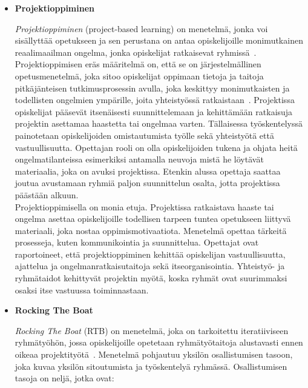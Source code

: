 \documentclass[finnish]{../tktltiki2}
\theoremstyle{definition}
\theoremstyle{remark}
\begin{document}
\begin{itemize}

\enlargethispage{\baselineskip}

\item {\bf Projektioppiminen}

\emph{Projektioppiminen} (project-based learning) on menetelmä, jonka voi sisällyttää opetukseen ja sen perustana on
antaa opiskelijoille monimutkainen reaalimaailman ongelma, jonka opiskelijat
ratkaisevat ryhmissä~\cite{Jun:2010,Larmer:2009,Markham:2003}. Projektioppimisen eräs määritelmä on, että se on järjestelmällinen
opetusmenetelmä, joka sitoo opiskelijat oppimaan tietoja ja taitoja pitkäjänteisen tutkimusprosessin
avulla, joka keskittyy monimutkaisten ja todellisten ongelmien ympärille, joita yhteistyössä
ratkaistaan~\cite{Markham:2003}. Projektissa opiskelijat pääsevät itsenäisesti suunnittelemaan ja kehittämään
ratkaisuja projektin asettamaa haastetta tai ongelmaa varten. Tällaisessa työskentelyssä painotetaan opiskelijoiden omistautumista
työlle sekä yhteistyötä että vastuullisuutta. Opettajan rooli on olla opiskelijoiden tukena ja ohjata heitä
ongelmatilanteissa esimerkiksi antamalla neuvoja mistä he löytävät materiaalia, joka on avuksi projektissa.
Etenkin alussa opettaja saattaa joutua avustamaan ryhmiä paljon suunnittelun osalta, jotta projektissa päästään alkuun.\\

Projektioppimisella on monia etuja. Projektissa ratkaistava haaste tai ongelma asettaa opiskelijoille
todellisen tarpeen tuntea opetukseen liittyvä materiaali, joka nostaa oppimismotivaatiota. Menetelmä opettaa
tärkeitä prosesseja, kuten kommunikointia ja suunnittelua. Opettajat ovat raportoineet, että projektioppiminen
kehittää opiskelijan vastuullisuutta, ajattelua ja ongelmanratkaisutaitoja sekä itseorganisointia. Yhteistyö-
ja ryhmätaidot kehittyvät projektin myötä, koska ryhmät ovat suurimmaksi osaksi itse vastuussa toiminnastaan.

\item {\bf Rocking The Boat}

\emph{Rocking The Boat} (RTB) on menetelmä, joka on tarkoitettu
iteratiiviseen ryhmätyöhön, jossa opiskelijoille opetetaan ryhmätyötaitoja alustavasti ennen oikeaa projektityötä~\cite{Pieterse:2012:PPS:2157136.2157218}. Menetelmä pohjautuu yksilön osallistumisen tasoon, joka kuvaa yksilön sitoutumista ja työskentelyä ryhmässä. Osallistumisen tasoja on neljä, jotka ovat:

\begin{enumerate}


\end{enumerate}
\end{itemize}
\end{document}
